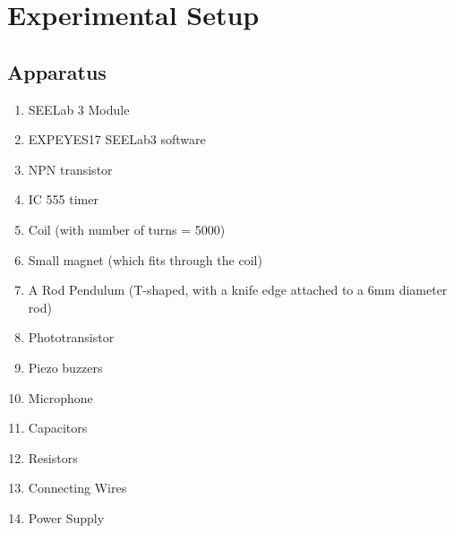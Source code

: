\section{Experimental Setup}

\subsection*{Apparatus}

\begin{enumerate}
    \item SEELab 3 Module
    \item EXPEYES17 SEELab3 software
    \item NPN transistor
    \item IC 555 timer
    \item Coil (with number of turns = 5000)
    \item Small magnet (which fits through the coil)
    \item A Rod Pendulum (T-shaped, with a knife
    edge attached to a 6mm diameter rod)
    \item Phototransistor 
    \item Piezo buzzers
    \item Microphone
    \item Capacitors
    \item Resistors
    \item Connecting Wires
    \item Power Supply
\end{enumerate}